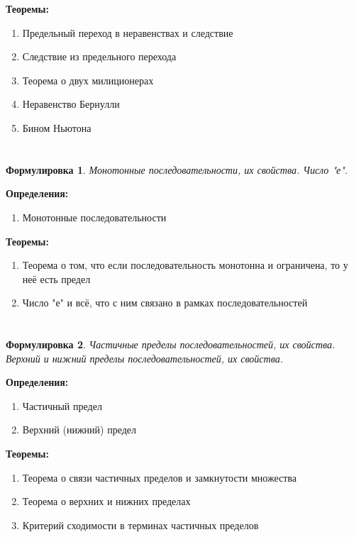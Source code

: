 \documentclass[a4paper]{article}
\theoremstyle{plain}
\newtheorem*{st}{Формулировка}
\theoremstyle{definition}
\theoremstyle{remark}
\begin{document}
\textbf{Теоремы:}
\begin{enumerate}
    \item Предельный переход в неравенствах и следствие
    \item Следствие из предельного перехода
    \item Теорема о двух милиционерах
    \item Неравенство Бернулли
    \item Бином Ньютона
\end{enumerate}


\section{}
\begin{st}
    Монотонные последовательности, их свойства. Число "е".
\end{st}

\textbf{Определения:}
\begin{enumerate}
    \item Монотонные последовательности
\end{enumerate}

\textbf{Теоремы:}
\begin{enumerate}
    \item Теорема о том, что если последовательность монотонна и ограничена, то у неё есть предел
    \item Число "е" и всё, что с ним связано в рамках последовательностей
\end{enumerate}


\section{}
\begin{st}
    Частичные пределы последовательностей, их свойства. Верхний и нижний пределы последовательностей, их свойства.
\end{st}

\textbf{Определения:}
\begin{enumerate}
    \item Частичный предел
    \item Верхний (нижний) предел
\end{enumerate}

\textbf{Теоремы:}
\begin{enumerate}
    \item Теорема о связи частичных пределов и замкнутости множества
    \item Теорема о верхних и нижних пределах
    \item Критерий сходимости в терминах частичных пределов
\end{enumerate}
\end{document}
